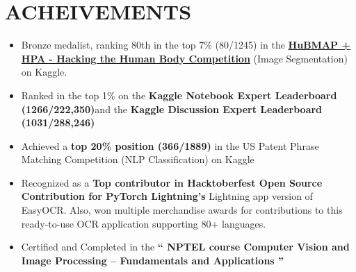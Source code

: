 \documentclass[a4paper,10pt]{extarticle}
\begin{document}
{%

\section*{ACHEIVEMENTS}
\begin{itemize}
    \item Bronze medalist, ranking 80th in the top 7\% (80/1245) in the \href{https://www.kaggle.com/competitions/hubmap-organ-segmentation/leaderboard}{\textbf{HuBMAP + HPA - Hacking the Human Body Competition}} (Image Segmentation) on Kaggle.
     
    \vspace{1.2mm}\item Ranked in the top 1\% on the \textbf{Kaggle Notebook Expert Leaderboard (1266/222,350)}and the \textbf{Kaggle Discussion Expert Leaderboard (1031/288,246)}

    \vspace{1.2mm}\item Achieved a \textbf{top 20\% position (366/1889)} in the US Patent Phrase Matching Competition (NLP Classification) on Kaggle

    \vspace{1.2mm}\item Recognized as a \textbf{Top contributor in Hacktoberfest Open Source Contribution for PyTorch Lightning's} Lightning app version of EasyOCR. Also, won multiple merchandise awards for contributions to this ready-to-use OCR application supporting 80+ languages.
    
    \vspace{1.2mm}\item Certified and Completed in the \textbf{`` NPTEL course Computer Vision and Image Processing – Fundamentals and Applications '' }
    
\end{itemize}

}
\end{document}
